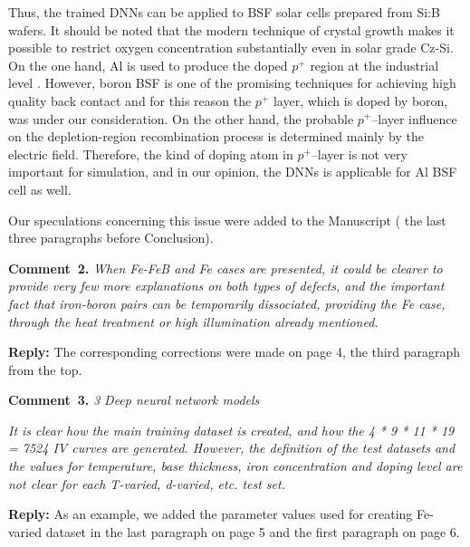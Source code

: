 \documentclass[num-refs]{wiley-article} %
\begin{document}
Thus, the trained DNNs can be applied to BSF solar cells prepared from Si:B wafers.
It should be noted that the modern  technique of crystal growth
makes it possible to restrict
oxygen concentration substantially even in solar grade Cz-Si.
On the one hand,  Al is used to produce the doped $p^+$ region
at the industrial level \cite{GreenRew2019,WilsonRew2020}.
However, boron BSF is one of the promising techniques
for achieving high quality back contact \cite{Kim2007,B-BSF}
and for this reason  the $p^{+}$ layer, which is doped by boron, was under our consideration.
On the other hand, the probable $p^+$--layer influence on the depletion-region recombination
process is determined mainly by the electric field.
Therefore, the kind of doping atom in $p^+$--layer is not very important for simulation,
and in our opinion, the  DNNs is applicable for Al BSF cell as well.

Our speculations concerning this issue were added to the Manuscript ( the last three paragraphs before Conclusion).

\vspace{1cm}
\noindent
\textcolor[rgb]{0.00,0.50,1.00}{\textbf{Comment~2.}}
\emph{When Fe-FeB and Fe cases are presented, it could be clearer to provide very few more explanations on both types of defects,
and the important fact that iron-boron pairs can be temporarily dissociated, providing the Fe case,
through the heat treatment or high illumination already mentioned. }

\vspace{0.5cm}
\noindent
\textcolor[rgb]{0.51,0.00,0.00}{\textbf{Reply:}}
The corresponding corrections were made on page 4, the third  paragraph from the top.


\vspace{1cm}
\noindent
\textcolor[rgb]{0.00,0.50,1.00}{\textbf{Comment~3.}}
\emph{3 Deep neural network models}

\emph{
It is clear how the main training dataset is created, and how the 4 * 9 * 11 * 19 = 7524 IV curves are generated.
However, the definition of the test datasets and the values for temperature,
base thickness, iron concentration and doping level are not clear for each T-varied, d-varied, etc. test set. }

\vspace{0.5cm}
\noindent
\textcolor[rgb]{0.51,0.00,0.00}{\textbf{Reply:}}
As an example, we added the parameter values used for creating Fe-varied dataset
in the last paragraph on page 5 and the first paragraph on page 6.
\end{document}
